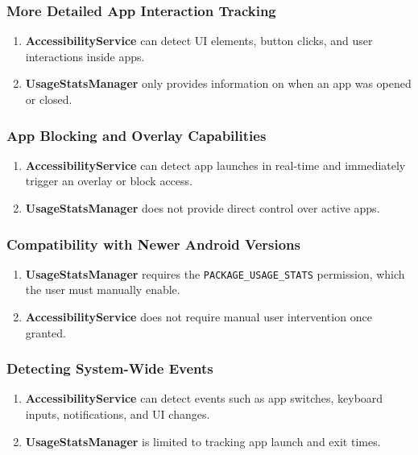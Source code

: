 \documentclass[12pt]{article}
\begin{document}
    \subsubsection{More Detailed App Interaction Tracking}
    \begin{enumerate}
        \item \textbf{AccessibilityService} can detect UI elements, button clicks, and user interactions inside apps.
        \item \textbf{UsageStatsManager} only provides information on when an app was opened or closed.
    \end{enumerate}
    
    \subsubsection{App Blocking and Overlay Capabilities}
    \begin{enumerate}
        \item \textbf{AccessibilityService} can detect app launches in real-time and immediately trigger an overlay or block access.
        \item \textbf{UsageStatsManager} does not provide direct control over active apps.
    \end{enumerate}
    
    \subsubsection{Compatibility with Newer Android Versions}
    \begin{enumerate}
        \item \textbf{UsageStatsManager} requires the \texttt{PACKAGE\_USAGE\_STATS} permission, which the user must manually enable.
        \item \textbf{AccessibilityService} does not require manual user intervention once granted.
    \end{enumerate}
    
    \subsubsection{Detecting System-Wide Events}
    \begin{enumerate}
        \item \textbf{AccessibilityService} can detect events such as app switches, keyboard inputs, notifications, and UI changes.
        \item \textbf{UsageStatsManager} is limited to tracking app launch and exit times.
    \end{enumerate}
    
\end{document}
